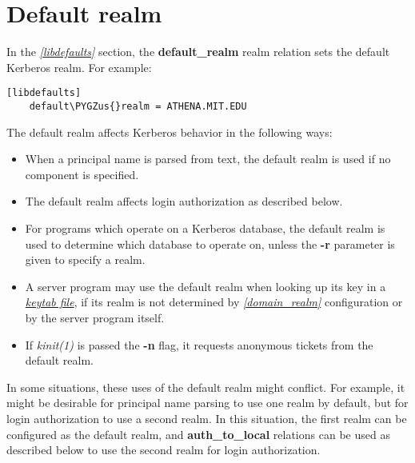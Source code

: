 \documentclass[letterpaper,10pt,english]{sphinxmanual}
\def\PYGZus{\char`\_}
\begin{document}
\section{Default realm}
\label{admin/host_config:default-realm}
In the {\hyperref[admin/conf_files/krb5_conf:libdefaults]{\emph{{[}libdefaults{]}}}} section, the \textbf{default\_realm} realm
relation sets the default Kerberos realm.  For example:

\begin{Verbatim}[commandchars=\\\{\}]
[libdefaults]
    default\PYGZus{}realm = ATHENA.MIT.EDU
\end{Verbatim}

The default realm affects Kerberos behavior in the following ways:
\begin{itemize}
\item {} 
When a principal name is parsed from text, the default realm is used
if no  component is specified.

\item {} 
The default realm affects login authorization as described below.

\item {} 
For programs which operate on a Kerberos database, the default realm
is used to determine which database to operate on, unless the \textbf{-r}
parameter is given to specify a realm.

\item {} 
A server program may use the default realm when looking up its key
in a {\hyperref[admin/install_appl_srv:keytab-file]{\emph{keytab file}}}, if its realm is not
determined by {\hyperref[admin/conf_files/krb5_conf:domain-realm]{\emph{{[}domain\_realm{]}}}} configuration or by the server
program itself.

\item {} 
If \emph{kinit(1)} is passed the \textbf{-n} flag, it requests anonymous
tickets from the default realm.

\end{itemize}

In some situations, these uses of the default realm might conflict.
For example, it might be desirable for principal name parsing to use
one realm by default, but for login authorization to use a second
realm.  In this situation, the first realm can be configured as the
default realm, and \textbf{auth\_to\_local} relations can be used as
described below to use the second realm for login authorization.
\end{document}
